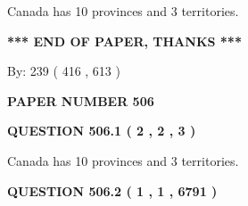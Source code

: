 \documentclass[12pt]{article}
\begin{document}
  
 
 
\noindent{}
 
 
Canada has 10  provinces and 3 territories.
 
 
 
 
   
   
 \vspace{0.2in}
 
   
   
   
   
\vspace{1.0in} 
{\textbf{\large{ *** END OF PAPER, THANKS *** }}} 
   
   
\hspace{1.0in} By: 
 239 ( 416 ,  613 )
   
   
   
   
\newpage 
\setcounter{page}{ 
   506001 } 
   
   
   
   
 {\textbf{ \Large{ PAPER NUMBER  506  }}}
   
   
\vspace{0.2in}
   
   
   
   
   
   
 \vspace{0.2in}
 
 
 
 
   
   
  
\vspace{0.2in}
  
{\textbf{\Large{QUESTION
506.1 
 ( 2 , 2 , 3 )
}}}
  
  
 
 
\noindent{}
 
 
Canada has 10  provinces and 3 territories.
 
 
 
 
  
\vspace{0.2in}
  
{\textbf{\Large{QUESTION
506.2 
 ( 1 , 1 , 6791 )
}}}
  
  
   
   
 \vspace{0.2in}
 
\end{document}
